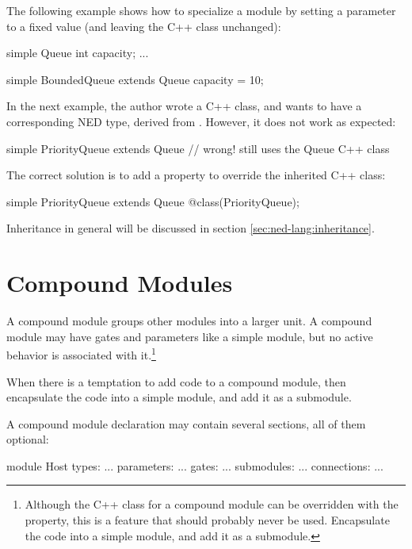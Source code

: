 The following example shows how to specialize a module by setting a parameter
to a fixed value (and leaving the C++ class unchanged):

\begin{ned}
simple Queue
{
   int capacity;
   ...
}

simple BoundedQueue extends Queue
{
   capacity = 10;
}
\end{ned}

In the next example, the author wrote a  C++ class, and
wants to have a corresponding NED type, derived from . However,
it does not work as expected:

\begin{ned}
simple PriorityQueue extends Queue // wrong! still uses the Queue C++ class
{
}
\end{ned}

The correct solution is to add a  property to override the
inherited C++ class:

\begin{ned}
simple PriorityQueue extends Queue
{
   @class(PriorityQueue);
}
\end{ned}

Inheritance in general will be discussed in section \ref{sec:ned-lang:inheritance}.



\section{Compound Modules}
\label{sec:ned-lang:compound-modules}

A compound module groups other modules into a larger unit. A compound
module may have gates and parameters like a simple module, but no active
behavior is associated with it.\footnote{Although the C++ class
for a compound module can be overridden with the  property,
this is a feature that should probably never be used. Encapsulate the code
into a simple module, and add it as a submodule.}

\begin{note}
    When there is a temptation to add code to a compound module,
    then encapsulate the code into a simple module, and add it as
    a submodule.
\end{note}

A compound module declaration may contain several sections,
all of them optional:

\begin{ned}
module Host
{
   types:
       ...
   parameters:
       ...
   gates:
       ...
   submodules:
       ...
   connections:
       ...
}
\end{ned}

